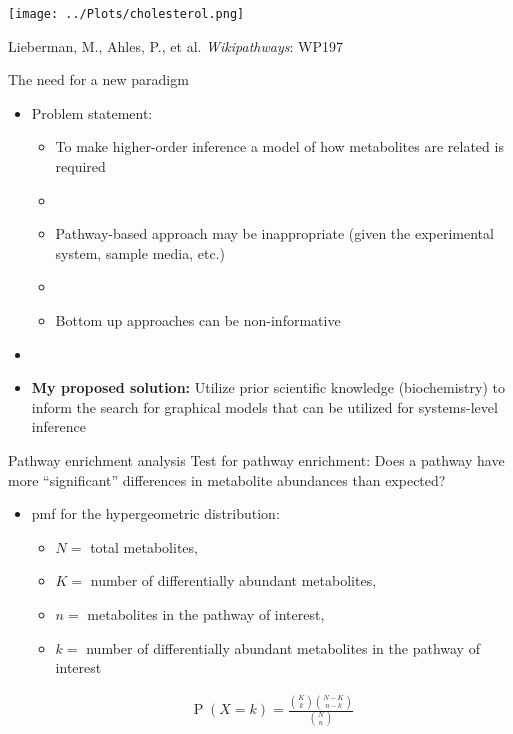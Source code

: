 \documentclass[xcolor=dvipsnames]{beamer}
\DeclareMathOperator{\PP}{P}
\begin{document}
\begin{frame}
	\begin{center}
			\texttt{[image: ../Plots/cholesterol.png]}
			
			Lieberman, M., Ahles, P., et al. \emph{Wikipathways}: WP197
	\end{center}
\end{frame}

\begin{frame}{The need for a new paradigm}
\vspace{-15.5pt}
\begin{itemize}
	\item Problem statement: \pause
	\begin{itemize}
		\item To make higher-order inference a model of how metabolites are related is required \pause
		\item[]
		\item Pathway-based approach may be inappropriate (given the experimental system, sample media, etc.) \pause
		\item[]
		\item Bottom up approaches can be non-informative \pause

	\end{itemize}
	\item[]
	\item \textbf{My proposed solution:} Utilize prior scientific knowledge (biochemistry) to inform the search for graphical models that can be utilized for systems-level inference
\end{itemize}
\end{frame}

\begin{frame}{Pathway enrichment analysis}
	\vspace{-10pt}
{\Large Test for pathway enrichment: Does a pathway have more ``significant'' differences in metabolite abundances than expected?} \vspace{10pt} \pause

	\begin{itemize}
		\item pmf for the hypergeometric distribution: 
		\begin{itemize}
			\item $N=$ total metabolites,
			\item $K=$ number of differentially abundant metabolites, 
			\item $n=$ metabolites in the pathway of interest, 
			\item $k=$ number of differentially abundant metabolites in the pathway of interest 
		\end{itemize}
		\begin{align*}
		\PP(X=k) = \frac{  {{K}\choose{k}} {{N-K}\choose{n-k}}  }{ {{N}\choose{n}} } 
		\end{align*}
	\end{itemize}
\end{frame}
\end{document}
